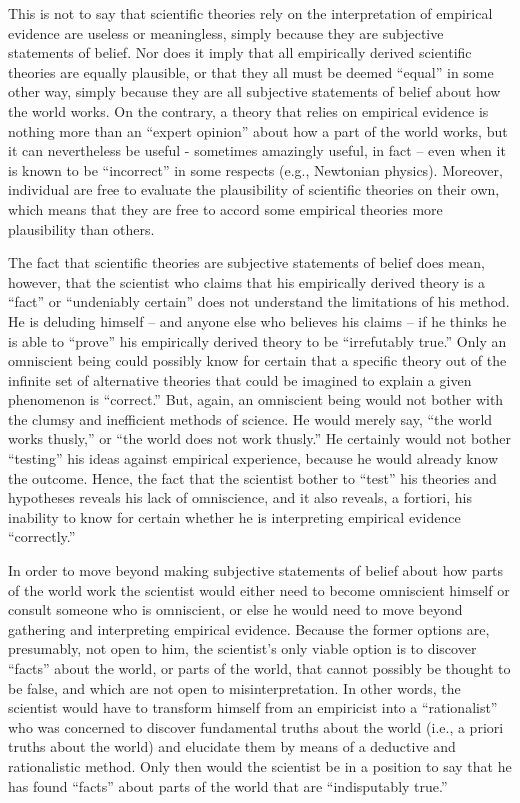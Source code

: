 This is not to say that scientific theories rely on the interpretation of empirical evidence are useless or meaningless, simply because they are subjective statements of belief. Nor does it imply that all empirically derived scientific theories are equally plausible, or that they all must be deemed “equal” in some other way, simply because they are all subjective statements of belief about how the world works. On the contrary, a theory that relies on empirical evidence is nothing more than an ``expert opinion'' about how a part of the world works, but it can nevertheless be useful - sometimes amazingly useful, in fact – even when it is known to be ``incorrect'' in some respects (e.g., Newtonian physics). Moreover, individual are free to evaluate the plausibility of scientific theories on their own, which means that they are free to accord some empirical theories more plausibility than others.

The fact that scientific theories are subjective statements of belief does mean, however, that the scientist who claims that his empirically derived theory is a ``fact'' or ``undeniably certain'' does not understand the limitations of his method. He is deluding himself – and anyone else who believes his claims – if he thinks he is able to ``prove'' his empirically derived theory to be ``irrefutably true.''  Only an omniscient being could possibly know for certain that a specific theory out of the infinite set of alternative theories that could be imagined to explain a given phenomenon is ``correct.''  But, again, an omniscient being would not bother with the clumsy and inefficient methods of science. He would merely say, ``the world works thusly,'' or ``the world does not work thusly.''  He certainly would not bother ``testing'' his ideas against empirical experience, because he would already know the outcome. Hence, the fact that the scientist bother to ``test'' his theories and hypotheses reveals his lack of omniscience, and it also reveals, a fortiori, his inability to know for certain whether he is interpreting empirical evidence ``correctly.''

In order to move beyond making subjective statements of belief about how parts of the world work the scientist would either need to become omniscient himself or consult someone who is omniscient, or else he would need to move beyond gathering and interpreting empirical evidence. Because the former options are, presumably, not open to him, the scientist’s only viable option is to discover “facts” about the world, or parts of the world, that cannot possibly be thought to be false, and which are not open to misinterpretation. In other words, the scientist would have to transform himself from an empiricist into a ``rationalist'' who was concerned to discover fundamental truths about the world (i.e., a priori truths about the world) and elucidate them by means of a deductive and rationalistic method. Only then would the scientist be in a position to say that he has found “facts” about parts of the world that are ``indisputably true.''

